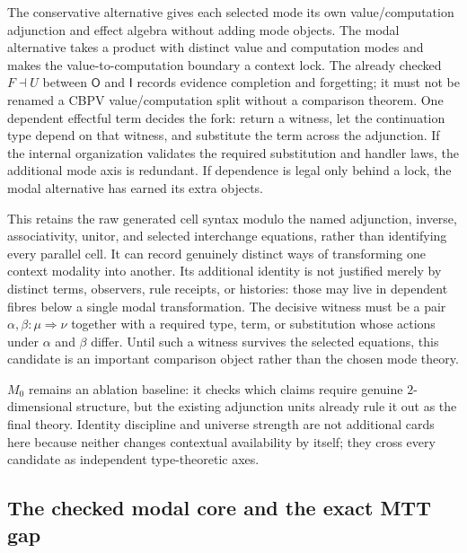\documentclass[11pt]{article}
\theoremstyle{definition}
\theoremstyle{remark}
\begin{document}
\begin{description}[style=nextline]
\item[Internal versus modal CBPV.]
  The conservative alternative gives each selected mode its own
  value/computation adjunction and effect algebra without adding mode objects.
  The modal alternative takes a product with distinct value and computation
  modes and makes the value-to-computation boundary a context lock.  The
  already checked $F\dashv U$ between $\mathsf O$ and $\mathsf I$ records
  evidence completion and forgetting; it must not be renamed a CBPV
  value/computation split without a comparison theorem.  One dependent
  effectful term decides the fork: return a witness, let the continuation type
  depend on that witness, and substitute the term across the adjunction.  If
  the internal organization validates the required substitution and handler
  laws, the additional mode axis is redundant.  If dependence is legal only
  behind a lock, the modal alternative has earned its extra objects.

\item[Selected proof-relevant quotient
  $\mathcal M_{\mathrm{OIE}}^{2}$.]
  This retains the raw generated cell syntax modulo the named adjunction,
  inverse, associativity, unitor, and selected interchange equations, rather
  than identifying every parallel cell.  It can record genuinely distinct
  ways of transforming one context modality into another.  Its additional
  identity is not justified merely by distinct terms, observers, rule
  receipts, or histories: those may live in dependent fibres below a single
  modal transformation.  The decisive witness must be a pair
  $\alpha,\beta:\mu\Rightarrow\nu$ together with a required type, term, or
  substitution whose actions under $\alpha$ and $\beta$ differ.  Until such a
  witness survives the selected equations, this candidate is an important
  comparison object rather than the chosen mode theory.
\end{description}

$M_0$ remains an ablation baseline: it checks which claims require genuine
$2$-dimensional structure, but the existing adjunction units already rule it
out as the final theory.  Identity discipline and universe strength are not
additional cards here because neither changes contextual availability by
itself; they cross every candidate as independent type-theoretic axes.

\subsection{The checked modal core and the exact MTT gap}
\end{document}
